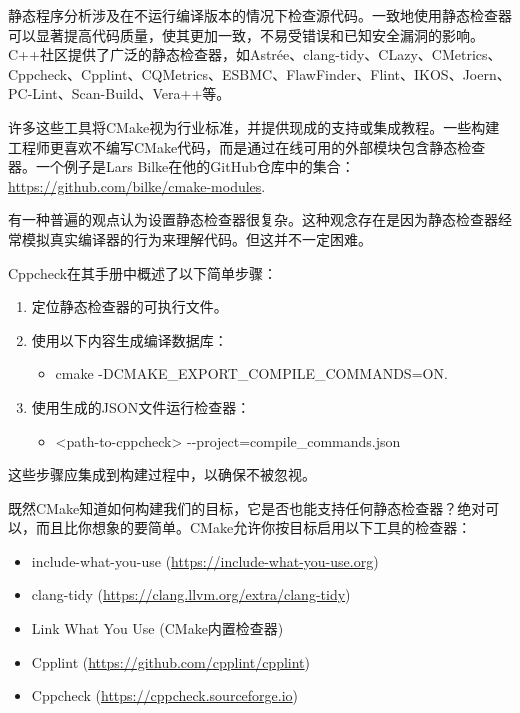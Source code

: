 
静态程序分析涉及在不运行编译版本的情况下检查源代码。一致地使用静态检查器可以显著提高代码质量，使其更加一致，不易受错误和已知安全漏洞的影响。C++社区提供了广泛的静态检查器，如Astrée、clang-tidy、CLazy、CMetrics、Cppcheck、Cpplint、CQMetrics、ESBMC、FlawFinder、Flint、IKOS、Joern、PC-Lint、Scan-Build、Vera++等。

许多这些工具将CMake视为行业标准，并提供现成的支持或集成教程。一些构建工程师更喜欢不编写CMake代码，而是通过在线可用的外部模块包含静态检查器。一个例子是Lars Bilke在他的GitHub仓库中的集合： \url{https://github.com/bilke/cmake-modules}.

有一种普遍的观点认为设置静态检查器很复杂。这种观念存在是因为静态检查器经常模拟真实编译器的行为来理解代码。但这并不一定困难。

Cppcheck在其手册中概述了以下简单步骤：

\begin{enumerate}
\item
定位静态检查器的可执行文件。

\item
使用以下内容生成编译数据库：
\begin{itemize}
\item
cmake -DCMAKE\_EXPORT\_COMPILE\_COMMANDS=ON.
\end{itemize}

\item
使用生成的JSON文件运行检查器：
\begin{itemize}
\item
<path-to-cppcheck> -{}-project=compile\_commands.json
\end{itemize}
\end{enumerate}

这些步骤应集成到构建过程中，以确保不被忽视。

既然CMake知道如何构建我们的目标，它是否也能支持任何静态检查器？绝对可以，而且比你想象的要简单。CMake允许你按目标启用以下工具的检查器：

\begin{itemize}
\item
include-what-you-use (\url{https://include-what-you-use.org})

\item
clang-tidy (\url{https://clang.llvm.org/extra/clang-tidy})

\item
Link What You Use (CMake内置检查器)

\item
Cpplint (\url{https://github.com/cpplint/cpplint})

\item
Cppcheck (\url{https://cppcheck.sourceforge.io})
\end{itemize}

